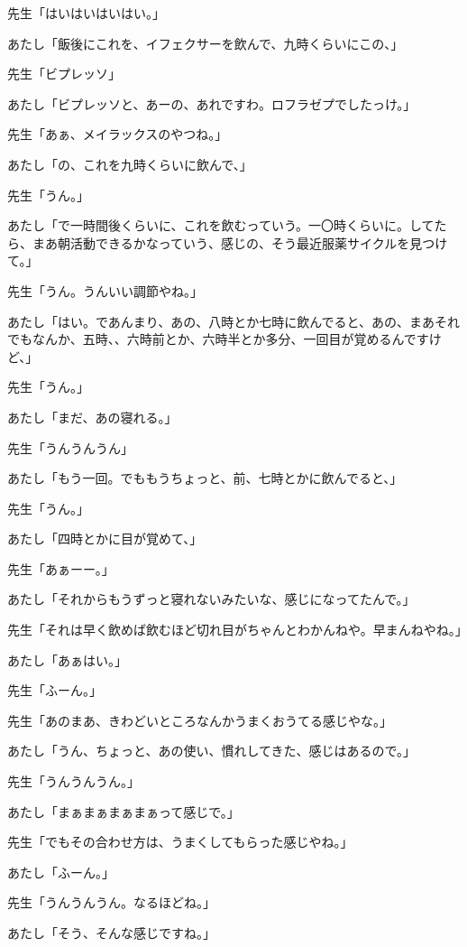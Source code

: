 \documentclass[b5j,twoside,twocolumn]{utarticle}
\begin{document}
\begin{description}
\item 先生「はいはいはいはい。」
\item あたし「飯後にこれを、イフェクサーを飲んで、九時くらいにこの、」
\item 先生「ビプレッソ」
\item あたし「ビプレッソと、あーの、あれですわ。ロフラゼプでしたっけ。」
\item 先生「あぁ、メイラックスのやつね。」
\item あたし「の、これを九時くらいに飲んで、」
\item 先生「うん。」
\item あたし「で一時間後くらいに、これを飲むっていう。一〇時くらいに。してたら、まあ朝活動できるかなっていう、感じの、そう最近服薬サイクルを見つけて。」
\item 先生「うん。うんいい調節やね。」
\item あたし「はい。であんまり、あの、八時とか七時に飲んでると、あの、まあそれでもなんか、五時、、六時前とか、六時半とか多分、一回目が覚めるんですけど、」
\item 先生「うん。」
\item あたし「まだ、あの寝れる。」
\item 先生「うんうんうん」
\item あたし「もう一回。でももうちょっと、前、七時とかに飲んでると、」
\item 先生「うん。」
\item あたし「四時とかに目が覚めて、」
\item 先生「あぁーー。」
\item あたし「それからもうずっと寝れないみたいな、感じになってたんで。」
\item 先生「それは早く飲めば飲むほど切れ目がちゃんとわかんねや。早まんねやね。」
\item あたし「あぁはい。」
\item 先生「ふーん。」
\item 先生「あのまあ、きわどいところなんかうまくおうてる感じやな。」
\item あたし「うん、ちょっと、あの使い、慣れしてきた、感じはあるので。」
\item 先生「うんうんうん。」
\item あたし「まぁまぁまぁまぁって感じで。」
\item 先生「でもその合わせ方は、うまくしてもらった感じやね。」
\item あたし「ふーん。」
\item 先生「うんうんうん。なるほどね。」
\item あたし「そう、そんな感じですね。」

\end{description}
\end{document}
